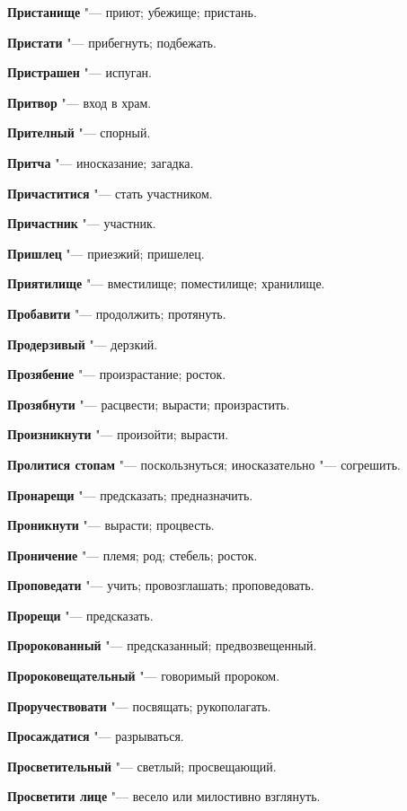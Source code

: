 \begin{mymulticols}
\noindent\textbf{Пристанище} "--- приют; убежище; пристань. 

\noindent\textbf{Пристати} "--- прибегнуть; подбежать. 

\noindent\textbf{Пристрашен} "--- испуган. 

\noindent\textbf{Притвор} "--- вход в храм. 

\noindent\textbf{Прителный} "--- спорный. 

\noindent\textbf{Притча} "--- иносказание; загадка. 

\noindent\textbf{Причаститися} "--- стать участником. 

\noindent\textbf{Причастник} "--- участник. 

\noindent\textbf{Пришлец} "--- приезжий; пришелец. 

\noindent\textbf{Приятилище} "--- вместилище; поместилище; хранилище. 

\noindent\textbf{Пробавити} "--- продолжить; протянуть. 

\noindent\textbf{Продерзивый} "--- дерзкий. 

\noindent\textbf{Прозябение} "--- произрастание; росток. 

\noindent\textbf{Прозябнути} "--- расцвести; вырасти; произрастить. 

\noindent\textbf{Произникнути} "--- произойти; вырасти. 

\noindent\textbf{Пролитися стопам} "--- поскользнуться; иносказательно "--- согрешить. 

\noindent\textbf{Пронарещи} "--- предсказать; предназначить. 

\noindent\textbf{Проникнути} "--- вырасти; процвесть. 

\noindent\textbf{Проничение} "--- племя; род; стебель; росток. 

\noindent\textbf{Проповедати} "--- учить; провозглашать; проповедовать. 

\noindent\textbf{Прорещи} "--- предсказать. 

\noindent\textbf{Пророкованный} "--- предсказанный; предвозвещенный. 

\noindent\textbf{Пророковещательный} "--- говоримый пророком. 

\noindent\textbf{Проручествовати} "--- посвящать; рукополагать. 

\noindent\textbf{Просаждатися} "--- разрываться. 

\noindent\textbf{Просветительный} "--- светлый; просвещающий. 

\noindent\textbf{Просветити лице} "--- весело или милостивно взглянуть. 


\end{mymulticols}
